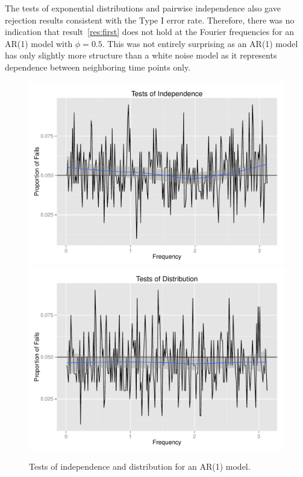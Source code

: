 \documentclass{article}\usepackage{graphicx, color}
\newenvironment{knitrout}{}{} %
\theoremstyle{plain}
\begin{document}
The tests of exponential distributions and pairwise independence also gave rejection results consistent with the Type I error rate. Therefore, there was no indication that result~\ref{res:first} does not hold at the Fourier frequencies for an AR(1) model with $\phi=0.5$. This was not entirely surprising as an AR(1) model has only slightly more structure than a white noise model as it represents dependence between neighboring time points only.

\begin{knitrout}
\color{fgcolor}\begin{figure}[h]

\includegraphics[width=.49\textwidth]{figure/tests-ar11} 
\includegraphics[width=.49\textwidth]{figure/tests-ar12} \caption[Tests of independence and distribution for an AR(1) model]{Tests of independence and distribution for an AR(1) model.\label{fig:tests-ar1}}
\end{figure}


\end{knitrout}
\end{document}
